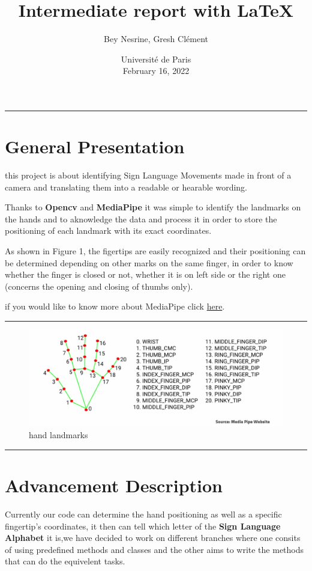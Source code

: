 \documentclass{article}
\begin{document}
	\title{Intermediate report with \LaTeX} 
	\author{Bey Nesrine, Gresh Clément}
	
	\date{Université de Paris \\[5mm]February 16, 2022 }
	
	\maketitle
	
	\tableofcontents\hrule
	
	\section{ General Presentation }\label{sec:first}
	this project is about identifying Sign Language Movements made in front of a camera and translating them into a readable or hearable wording.
	
	
	Thanks to \textbf{Opencv} and \textbf{MediaPipe} it was simple to identify the landmarks on the hands and to aknowledge the data and process it in order to store the positioning of each landmark with its exact coordinates.
	
	As shown in Figure 1, the figertips are easily recognized and their positioning can be determined depending on other marks on the same finger, in order to know whether the finger is closed or not, whether it is on left side or the right one (concerns the opening and closing of thumbs only).
	
	if you would like to know more about MediaPipe click \href{https://mediapipe.dev/}{here}.
	
	\hrule
	\begin{figure}[h!]
		\center
		\includegraphics[width=\linewidth]{landmarks.png}
		\caption{ hand landmarks}
	\end{figure}
\hrule
	\section{Advancement Description}\label{sec:second}
	Currently our code can determine the hand positioning as well as a specific fingertip's coordinates, it then can tell which letter of the \textbf{Sign Language Alphabet} it is,we have decided to work on different branches where one consits of using predefined methods and classes and the other aims to write the methods that can do the equivelent tasks.
	
\end{document}
